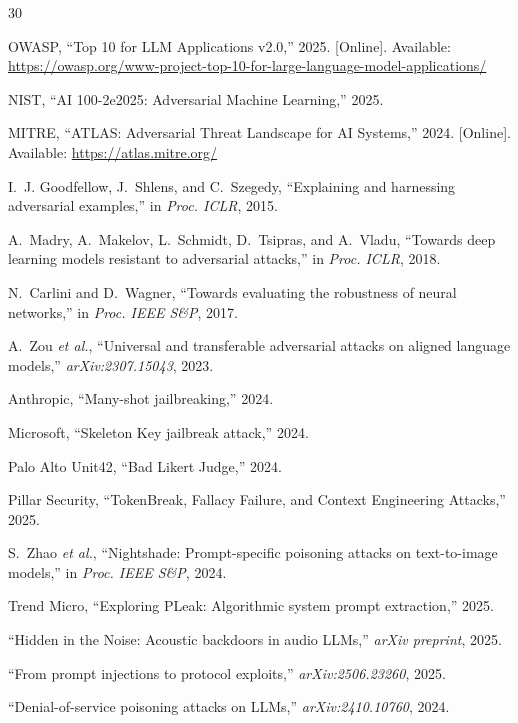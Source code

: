 \documentclass[conference]{IEEEtran}
\begin{document}
\begin{thebibliography}{30}

OWASP, ``Top 10 for LLM Applications v2.0,'' 2025. [Online]. Available: \url{https://owasp.org/www-project-top-10-for-large-language-model-applications/}

NIST, ``AI 100-2e2025: Adversarial Machine Learning,'' 2025.

MITRE, ``ATLAS: Adversarial Threat Landscape for AI Systems,'' 2024. [Online]. Available: \url{https://atlas.mitre.org/}

I.~J. Goodfellow, J.~Shlens, and C.~Szegedy, ``Explaining and harnessing adversarial examples,'' in \emph{Proc. ICLR}, 2015.

A.~Madry, A.~Makelov, L.~Schmidt, D.~Tsipras, and A.~Vladu, ``Towards deep learning models resistant to adversarial attacks,'' in \emph{Proc. ICLR}, 2018.

N.~Carlini and D.~Wagner, ``Towards evaluating the robustness of neural networks,'' in \emph{Proc. IEEE S\&P}, 2017.

A.~Zou \emph{et al.}, ``Universal and transferable adversarial attacks on aligned language models,'' \emph{arXiv:2307.15043}, 2023.

Anthropic, ``Many-shot jailbreaking,'' 2024.

Microsoft, ``Skeleton Key jailbreak attack,'' 2024.

Palo Alto Unit42, ``Bad Likert Judge,'' 2024.

Pillar Security, ``TokenBreak, Fallacy Failure, and Context Engineering Attacks,'' 2025.

S.~Zhao \emph{et al.}, ``Nightshade: Prompt-specific poisoning attacks on text-to-image models,'' in \emph{Proc. IEEE S\&P}, 2024.

Trend Micro, ``Exploring PLeak: Algorithmic system prompt extraction,'' 2025.

``Hidden in the Noise: Acoustic backdoors in audio LLMs,'' \emph{arXiv preprint}, 2025.

``From prompt injections to protocol exploits,'' \emph{arXiv:2506.23260}, 2025.

``Denial-of-service poisoning attacks on LLMs,'' \emph{arXiv:2410.10760}, 2024.


\end{thebibliography}
\end{document}
